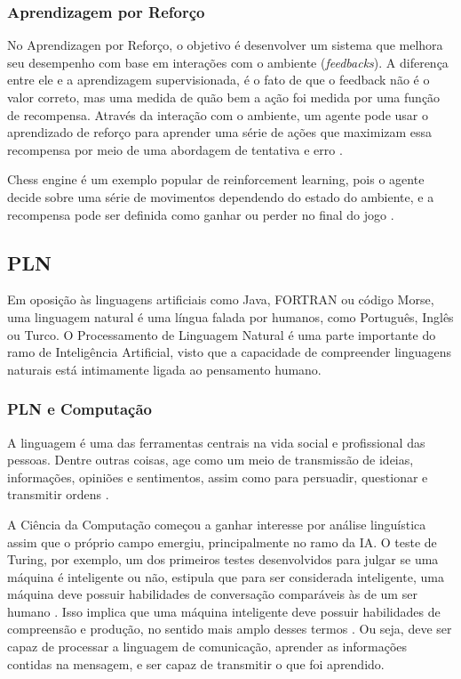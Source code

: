 \documentclass[
	12pt,				%
	openright,			%
	oneside,			%
	a4paper,			%
	english,			%
	spanish,			%
	brazil				%
	]{abntex2}
\begin{document}
	\subsubsection*{Aprendizagem por Reforço}
		No Aprendizagen por Reforço, o objetivo é desenvolver um sistema que melhora seu desempenho com base em interações com o ambiente (\emph{feedbacks}). A diferença entre ele e a aprendizagem supervisionada, é o fato de que o feedback não é o valor correto, mas uma medida de quão bem a ação foi medida por uma função de recompensa. Através da interação com o ambiente, um agente pode usar o aprendizado de reforço para aprender uma série de ações que maximizam essa recompensa por meio de uma abordagem de tentativa e erro \cite{ r_julian_heart}.

		Chess engine é um exemplo popular de reinforcement learning, pois o agente decide sobre uma série de movimentos dependendo do estado do ambiente, e a recompensa pode ser definida como ganhar ou perder no final do jogo \cite{r_julian_heart}.

	\subsection{\gls{PLN}}
	Em oposição às linguagens artificiais como Java, FORTRAN ou código Morse, uma linguagem natural é uma língua falada por humanos, como Português, Inglês ou Turco. O Processamento de Linguagem Natural é uma parte importante do ramo de Inteligência Artificial, visto que a capacidade de compreender linguagens naturais está intimamente ligada ao pensamento humano. %
	
		\subsubsection*{\gls{PLN} e Computação}
		A linguagem é uma das ferramentas centrais na vida social e profissional das pessoas. Dentre outras coisas, age como um meio de transmissão de ideias, informações, opiniões e sentimentos, assim como para persuadir, questionar e transmitir ordens \cite{book_natural_lang}.
		
	A Ciência da Computação começou a ganhar interesse por análise linguística assim que o próprio campo emergiu, principalmente no ramo da \gls{IA}. O teste de Turing, por exemplo, um dos primeiros testes desenvolvidos para julgar se uma máquina é inteligente ou não, estipula que para ser considerada inteligente, uma máquina deve possuir habilidades de conversação comparáveis às de um ser humano \cite{turing}. Isso implica que uma máquina inteligente deve possuir habilidades de compreensão e produção, no sentido mais amplo desses termos \cite{book_natural_lang}. Ou seja, deve ser capaz de processar a linguagem de comunicação, aprender as informações contidas na mensagem, e ser capaz de transmitir o que foi aprendido. 	
	
\end{document}
